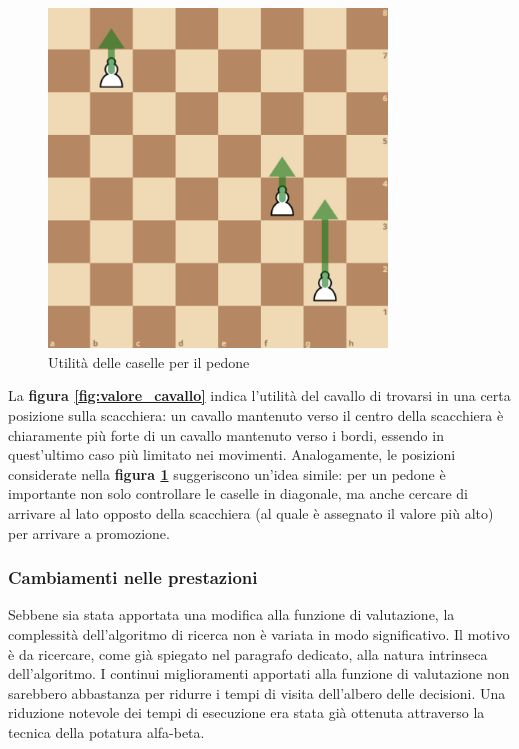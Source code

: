 \begin{figure}[!htb]
    \includegraphics[width=9cm]{frontmatter/figure/pedone2.pdf}
    \centering
    \caption{Utilità delle caselle per il pedone}
    \label{fig:valore_pedoni}
\end{figure}
\newpage
La \textbf{figura \ref{fig:valore_cavallo}} indica l'utilità del cavallo di trovarsi in una certa posizione sulla scacchiera: un cavallo mantenuto verso il centro della scacchiera è chiaramente più forte di un cavallo mantenuto verso i bordi, essendo in quest'ultimo caso più limitato nei movimenti. Analogamente, le posizioni considerate nella \textbf{figura \ref{fig:valore_pedoni}} suggeriscono un'idea simile: per un pedone è importante non solo controllare le caselle in diagonale, ma anche cercare di arrivare al lato opposto della scacchiera (al quale è assegnato il valore più alto) per arrivare a promozione. 

\subsubsection{Cambiamenti nelle prestazioni}
Sebbene sia stata apportata una modifica alla funzione di valutazione, la complessità dell'algoritmo di ricerca non è variata in modo significativo. Il motivo è da ricercare, come già spiegato nel paragrafo dedicato, alla natura intrinseca dell'algoritmo. I continui miglioramenti apportati alla funzione di valutazione non sarebbero abbastanza per ridurre i tempi di visita dell'albero delle decisioni. Una riduzione notevole dei tempi di esecuzione era stata già ottenuta attraverso la tecnica della potatura alfa-beta.

